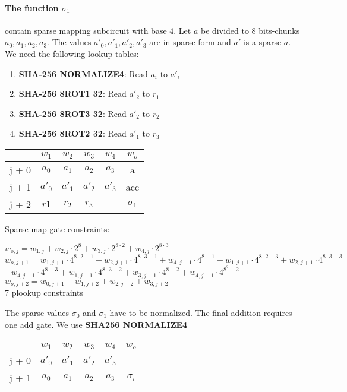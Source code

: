 \paragraph{The function $\sigma_1$} contain sparse mapping subcircuit with base $4$.
Let $a$ be divided to 8 bits-chunks $a_0, a_1, a_2, a_3$.
The values $a'_0, a'_1, a'_2, a'_3$ are in sparse form and $a'$ is a sparse $a$.
We need the following lookup tables:
\begin{enumerate}
\item \textbf{SHA-256 NORMALIZE4}: Read $a_i$ to $a'_i$
\item \textbf{SHA-256 8ROT1 32}: Read $a'_2$ to $r_1$
\item \textbf{SHA-256 8ROT3 32}: Read $a'_2$ to $r_2$ 
\item \textbf{SHA-256 8ROT2 32}: Read $a'_1$ to $r_3$ 
\end{enumerate}
\begin{center}
\begin{tabular}{ c|c|c|c|c|c } 
  & $w_1$ & $w_2$ & $w_3$ & $w_4$ & $w_o$\\ 
 \hline
j + 0 & $a_0$ & $ a_1$ & $a_2$ & $a_3$ & a\\ 
j + 1 & $a'_0$ & $a'_1$ & $a'_2$ & $a'_3$ & acc \\ 
j + 2 & $r1 $& $r_2$ & $r_3$ &   & $\sigma_1$ \\ 
\end{tabular}
\end{center}
Sparse map gate constraints:
\begin{center}
$w_{o,j} = w_{1,j} + w_{2,j} \cdot 2^8 + w_{3,j} \cdot 2^{8 \cdot 2} + w_{4,j} \cdot 2^{8 \cdot 3}$ \\
$w_{o,j + 1} = w_{1,j + 1} \cdot 4^{8 \cdot 2 - 1} + w_{2,j + 1} \cdot 4^{8 \cdot 3 - 1} + w_{4,j + 1} \cdot 4^{8 - 1}
	 	+ w_{1,j + 1} \cdot 4^{8 \cdot 2 - 3} + w_{2,j + 1} \cdot 4^{8 \cdot 3 - 3}$\\
	 $+ w_{4,j + 1} \cdot 4^{8 - 3}
	 	+ w_{1,j + 1} \cdot 4^{8 \cdot 3 - 2} + w_{3,j + 1} \cdot 4^{8-2} + w_{4,j + 1} \cdot 4^{8^2 - 2}$ \\
$w_{o, j+2} = w_{0, j+1} + w_{1,j+2} + w_{2, j+2} + w_{3, j+2}$ \\
7 plookup constraints \\
\end{center}

The sparse values $\sigma_0$ and $\sigma_1$ have to be normalized.
The final addition requires one add gate.
We use \textbf{SHA256 NORMALIZE4}
\begin{center}
\begin{tabular}{ c|c|c|c|c|c } 
  & $w_1$ & $w_2$ & $w_3$ & $w_4$ & $w_o$\\ 
 \hline
j + 0 & $a'_0$ & $a'_1$ & $a'_2$ & $a'_3$ &\\ 
j + 1 & $a_0$ & $ a_1$ & $a_2$ & $a_3$ &  $\sigma_i$ \\ 
\end{tabular}
\end{center}

